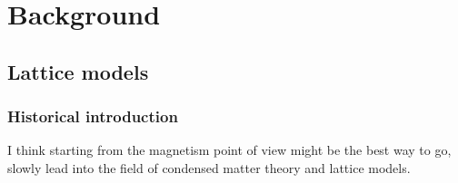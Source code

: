 
\chapter{Background}
\label{chapter2}

\ifpdf
    \graphicspath{{Chapter2/Figs/Raster/}{Chapter2/Figs/PDF/}{Chapter2/Figs/}}
\else
    \graphicspath{{Chapter2/Figs/Vector/}{Chapter2/Figs/}}
\fi

\section{Lattice models}
\label{sec:lattice-models}

\subsection{Historical introduction}
\label{subsec:latt-hist}
I think starting from the magnetism point of view might be the best way to go, slowly lead into the field of condensed matter theory and lattice models. 

